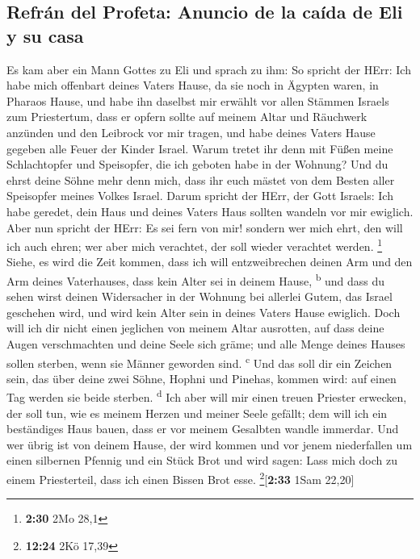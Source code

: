 \hypertarget{refruxe1n-del-profeta-anuncio-de-la-cauxedda-de-eli-y-su-casa}{%
\subsection{Refrán del Profeta: Anuncio de la caída de Eli y su
casa}\label{refruxe1n-del-profeta-anuncio-de-la-cauxedda-de-eli-y-su-casa}}

 Es kam aber ein Mann Gottes zu Eli und sprach zu ihm: So
spricht der HErr: Ich habe mich offenbart deines Vaters Hause, da sie
noch in Ägypten waren, in Pharaos Hause,  und habe ihn
daselbst mir erwählt vor allen Stämmen Israels zum Priestertum, dass er
opfern sollte auf meinem Altar und Räuchwerk anzünden und den Leibrock
vor mir tragen, und habe deines Vaters Hause gegeben alle Feuer der
Kinder Israel.  Warum tretet ihr denn mit Füßen meine
Schlachtopfer und Speisopfer, die ich geboten habe in der Wohnung? Und
du ehrst deine Söhne mehr denn mich, dass ihr euch mästet von dem Besten
aller Speisopfer meines Volkes Israel.  Darum spricht der
HErr, der Gott Israels: Ich habe geredet, dein Haus und deines Vaters
Haus sollten wandeln vor mir ewiglich. Aber nun spricht der HErr: Es sei
fern von mir! sondern wer mich ehrt, den will ich auch ehren; wer aber
mich verachtet, der soll wieder verachtet werden. \footnote{\textbf{2:30}
  2Mo 28,1}  Siehe, es wird die Zeit kommen, dass ich
will entzweibrechen deinen Arm und den Arm deines Vaterhauses, dass kein
Alter sei in deinem Hause, \textsuperscript{b}  und dass
du sehen wirst deinen Widersacher in der Wohnung bei allerlei Gutem, das
Israel geschehen wird, und wird kein Alter sein in deines Vaters Hause
ewiglich.  Doch will ich dir nicht einen jeglichen von
meinem Altar ausrotten, auf dass deine Augen verschmachten und deine
Seele sich gräme; und alle Menge deines Hauses sollen sterben, wenn sie
Männer geworden sind. \textsuperscript{c}  Und das soll
dir ein Zeichen sein, das über deine zwei Söhne, Hophni und Pinehas,
kommen wird: auf einen Tag werden sie beide sterben. \textsuperscript{d}
 Ich aber will mir einen treuen Priester erwecken, der
soll tun, wie es meinem Herzen und meiner Seele gefällt; dem will ich
ein beständiges Haus bauen, dass er vor meinem Gesalbten wandle
immerdar.  Und wer übrig ist von deinem Hause, der wird
kommen und vor jenem niederfallen um einen silbernen Pfennig und ein
Stück Brot und wird sagen: Lass mich doch zu einem Priesterteil, dass
ich einen Bissen Brot esse. \footnote{\textbf{12:24} 2Kö 17,39}{[}\textbf{2:33}
1Sam 22,20{]}

